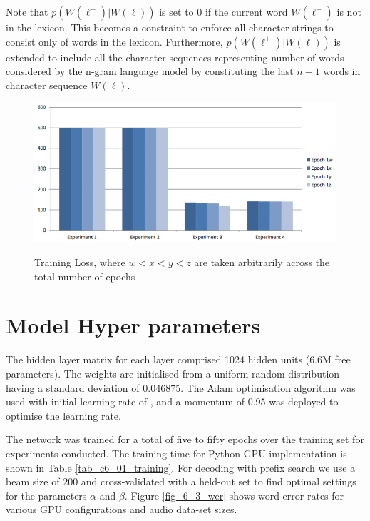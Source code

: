 Note that $p(W(\ell^+)|W(\ell))$ is set to $0$ if the current word $W(\ell^+)$ is not in the lexicon. This becomes a constraint to enforce all character strings to consist only of words in the lexicon.  Furthermore,  $p(W(\ell^+)|W(\ell))$ is extended to include all the character sequences representing number of words considered by the n-gram language model by constituting the last $n-1$ words in character sequence $W(\ell)$.

\begin{figure}
\centering
  \includegraphics[width=14cm]{thesis/images/res00.PNG}\\
  \caption{Training Loss, where $w<x<y<z$ are taken arbitrarily across the
total number of epochs} \label{fig_6_2_loss}
\end{figure}

\section{Model Hyper parameters}
The hidden layer matrix for each layer comprised 1024 hidden units (6.6M free parameters).  The weights are initialised from a uniform random distribution having a standard deviation of 0.046875.  The Adam optimisation algorithm \citep{kingma2014adam} was used with initial learning rate of , and a momentum of 0.95 was deployed to optimise the learning rate.

The network was trained for a total of five to fifty epochs over the training set for experiments conducted. The training time for Python GPU implementation is shown in Table \ref{tab_c6_01_training}.  For decoding with prefix search we use a beam size of $200$ and cross-validated with a held-out set to find optimal settings for the parameters $\alpha$ and $\beta$. Figure \ref{fig_6_3_wer} shows word error rates for various GPU configurations and audio data-set sizes.

